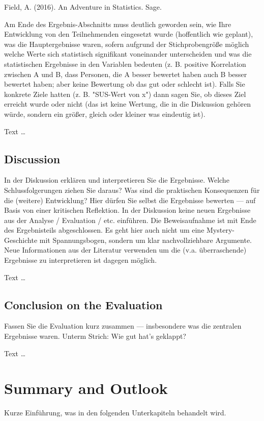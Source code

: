 \documentclass[11pt,a4paper,english]{scrreprt}
\newenvironment{comment}
  {\par\medskip
   \begingroup\color{olive}%
   }
 {\endgroup
  \medskip}
\begin{document}
\begin{comment}
Field, A. (2016). An Adventure in Statistics. Sage.

Am Ende des Ergebnis-Abschnitts muss deutlich geworden sein, wie Ihre Entwicklung von den Teilnehmenden eingesetzt wurde (hoffentlich wie geplant), was die Hauptergebnisse waren, sofern aufgrund der Stichprobengröße möglich welche Werte sich statistisch signifikant voneinander unterscheiden und was die statistischen Ergebnisse in den Variablen bedeuten (z. B. positive Korrelation zwischen A und B, dass Personen, die A besser bewertet haben auch B besser bewertet haben; aber keine Bewertung ob das gut oder schlecht ist). Falls Sie konkrete Ziele hatten (z. B. "SUS-Wert von x") dann sagen Sie, ob dieses Ziel erreicht wurde oder nicht (das ist keine Wertung, die in die Diskussion gehören würde, sondern ein größer, gleich oder kleiner was eindeutig ist).
\end{comment}

Text \dots

\section{Discussion}
\begin{comment}
In der Diskussion erklären und interpretieren Sie die Ergebnisse. Welche Schlussfolgerungen ziehen Sie daraus? Was sind die praktischen Konsequenzen für die (weitere) Entwicklung? Hier dürfen Sie selbst die Ergebnisse bewerten — auf Basis von einer kritischen Reflektion.
In der Diskussion keine neuen Ergebnisse aus der Analyse / Evaluation / etc. einführen. Die Beweisaufnahme ist mit Ende des Ergebnisteils abgeschlossen. Es geht hier auch nicht um eine Mystery-Geschichte mit Spannungsbogen, sondern um klar nachvollziehbare Argumente. Neue Informationen aus der Literatur verwenden um die (v.a. überraschende) Ergebnisse zu interpretieren ist dagegen möglich.
\end{comment}

Text \dots

\section{Conclusion on the Evaluation}
\begin{comment}
Fassen Sie die Evaluation kurz zusammen — insbesondere was die zentralen Ergebnisse waren. Unterm Strich: Wie gut hat's geklappt?
\end{comment}

Text \dots

\newpage
\chapter{Summary and Outlook}
\begin{comment}
Kurze Einführung, was in den folgenden Unterkapiteln behandelt wird.
\end{comment}
\end{document}
